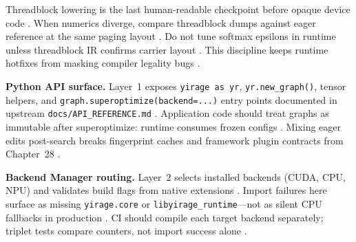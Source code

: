 Threadblock lowering is the last human-readable checkpoint before opaque device code \citep{yirage2026,chen2020compilerbasedhardw,semianalysis2024tma,patel2025llminference,dlbook}. When numerics diverge, compare threadblock dumps against eager reference at the same paging layout \citep{kwon2023vllm,dao2022flashattention,yirage2026,chen2020compilerbasedhardw,patel2025llminference,dlbook}. Do not tune softmax epsilons in runtime unless threadblock IR confirms carrier layout \citep{dao2022flashattention,yirage2026,chen2020compilerbasedhardw,patel2025llminference,dlbook}. This discipline keeps runtime hotfixes from masking compiler legality bugs \citep{yirage2026,chen2020compilerbasedhardw,patel2025llminference,dlbook}.

\textbf{Python API surface.} Layer~1 exposes \texttt{yirage as yr}, \texttt{yr.new\_graph()}, tensor helpers, and \texttt{graph.superoptimize(backend=...)} entry points documented in upstream \texttt{docs/API\_REFERENCE.md} \citep{yirage2026,chen2020compilerbasedhardw,patel2025llminference,dlbook}. Application code should treat graphs as immutable after superoptimize: runtime consumes frozen configs \citep{yirage2026,chen2020compilerbasedhardw,taxbreak2026,memoryfloor2026,patel2025llminference,kwon2023vllm,nvidia2024cudagraphs,dao2022flashattention,dlbook}. Mixing eager edits post-search breaks fingerprint caches and framework plugin contracts from Chapter~28 \citep{yirage2026,chen2020compilerbasedhardw,kwon2023vllm,patel2025llminference,memoryfloor2026,taxbreak2026,dlbook}.

\textbf{Backend Manager routing.} Layer~2 selects installed backends (CUDA, CPU, NPU) and validates build flags from native extensions \citep{yirage2026,chen2020compilerbasedhardw,amd2024xdna,amd2024aie,patel2025llminference,dlbook,semianalysis2024tma,liu2024deepseekv3,taxbreak2026,memoryfloor2026,dao2022flashattention,dao2023flashdecoding,nvidia2022hopper,nvidia2024cudagraphs,kwon2023vllm,dlbook}. Import failures here surface as missing \texttt{yirage.core} or \texttt{libyirage\_runtime}---not as silent CPU fallbacks in production \citep{yirage2026,chen2020compilerbasedhardw,patel2025llminference,dlbook}. CI should compile each target backend separately; triplet tests compare counters, not import success alone \citep{yirage2026,chen2020compilerbasedhardw,patel2025llminference,amd2024xdna,amd2024aie,taxbreak2026,memoryfloor2026,dlbook}.

